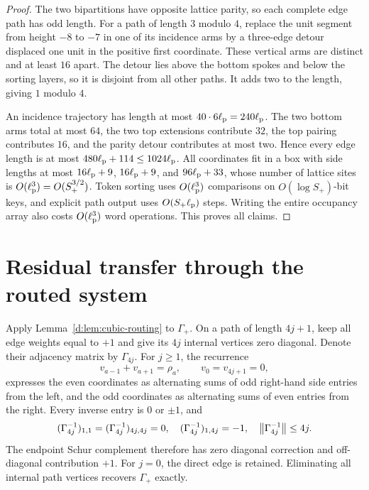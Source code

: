 \begin{proof}
The two bipartitions have opposite lattice parity, so each complete
edge path has odd length. For a path of length $3$ modulo $4$, replace
the unit segment from height $-8$ to $-7$ in one of its incidence arms
by a three-edge detour displaced one unit in the positive first
coordinate. These vertical arms are distinct and at least $16$ apart.
The detour lies above the bottom spokes and below the sorting layers,
so it is disjoint from all other paths. It adds two to the length,
giving $1$ modulo $4$.

An incidence trajectory has length at most $40\cdot6\ell_{\rm p}=240\ell_{\rm p}$. The two bottom
arms total at most $64$, the two top extensions contribute $32$, the
top pairing contributes $16$, and the parity detour contributes at
most two. Hence every edge length is at most
$480\ell_{\rm p}+114\le1024\ell_{\rm p}$. All coordinates fit in a box with side lengths
at most $16\ell_{\rm p}+9$, $16\ell_{\rm p}+9$, and $96\ell_{\rm p}+33$, whose number of lattice sites
is $O(\ell_{\rm p}^3)=O(S_+^{3/2})$. Token sorting uses $O(\ell_{\rm p}^3)$ comparisons on
$O(\log S_+)$-bit keys, and explicit path output uses $O(S_+\ell_{\rm p})$ steps.
Writing the entire occupancy array also costs $O(\ell_{\rm p}^3)$ word operations.
This proves all claims.
\end{proof}

\section{Residual transfer through the routed system}
\label{d:app:logical-residual}

Apply Lemma~\ref{d:lem:cubic-routing} to $\Gamma_+$. On a path of length
$4j+1$, keep all edge weights equal to $+1$ and give its $4j$ internal
vertices zero diagonal. Denote their adjacency matrix by $\Gamma_{4j}$.
For $j\ge1$, the recurrence
\begin{equation}
 v_{a-1}+v_{a+1}=\rho_a,\qquad v_0=v_{4j+1}=0,
\end{equation}
expresses the even coordinates as alternating sums of odd right-hand
side entries from the left, and the odd coordinates as alternating
sums of even entries from the right. Every inverse entry is $0$ or
$\pm1$, and
\begin{equation}
 (\Gamma_{4j}^{-1})_{1,1}=(\Gamma_{4j}^{-1})_{4j,4j}=0,
 \quad (\Gamma_{4j}^{-1})_{1,4j}=-1,
 \quad \left\lVert \Gamma_{4j}^{-1}\right\rVert\le4j.
 \label{d:eq:app-wire-inverse}
\end{equation}
The endpoint Schur complement therefore has zero diagonal correction
and off-diagonal contribution $+1$. For $j=0$, the direct edge is
retained. Eliminating all internal path vertices recovers $\Gamma_+$
exactly.

